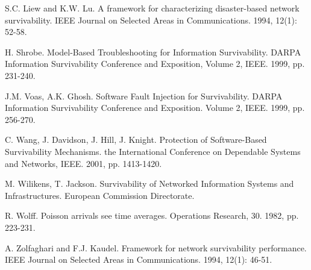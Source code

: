 \documentclass[onecolumn,conference]{IEEEtran}
\begin{document}
\begin{thebibliography}{00}
         S.C. Liew and K.W. Lu. A framework for characterizing disaster-based network survivability. IEEE Journal on Selected Areas in Communications. 1994, 12(1): 52-58.

         H. Shrobe. Model-Based Troubleshooting for Information Survivability. DARPA Information Survivability Conference and Exposition, Volume 2, IEEE. 1999, pp. 231-240.

         J.M. Voas, A.K. Ghosh. Software Fault Injection for Survivability. DARPA Information Survivability Conference and Exposition. Volume 2, IEEE. 1999, pp. 256-270.

         C. Wang, J. Davidson, J. Hill, J. Knight. Protection of Software-Based Survivability Mechanisms. the International Conference on Dependable Systems and Networks, IEEE. 2001, pp. 1413-1420.

         M. Wilikens, T. Jackson. Survivability of Networked Information Systems and Infrastructures. European Commission Directorate.

         R. Wolff. Poisson arrivals see time averages. Operations Research, 30. 1982, pp. 223-231.

         A. Zolfaghari and F.J. Kaudel. Framework for network survivability performance. IEEE Journal on Selected Areas in Communications. 1994, 12(1): 46-51.

    \end{thebibliography}
\end{document}
